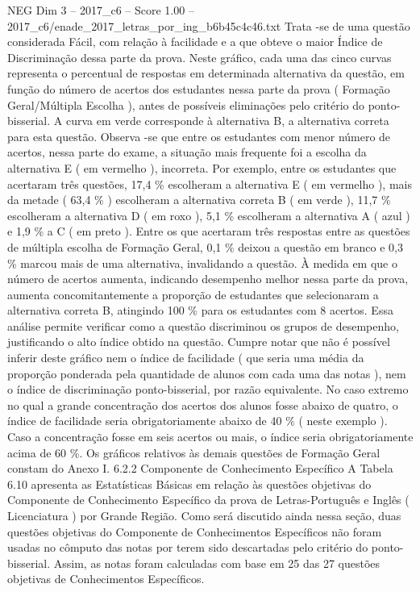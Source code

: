 \begin{textsample}{NEG Dim 3 – 2017\_c6 – Score 1.00 – 2017\_c6/enade\_2017\_letras\_por\_ing\_b6b45c4c46.txt}
Trata -se de uma questão considerada Fácil, com relação à facilidade e a que obteve o maior Índice de Discriminação dessa parte da prova.
Neste gráfico, cada uma das cinco curvas representa o percentual de respostas em determinada alternativa da questão, em função do número de acertos dos estudantes nessa parte da prova ( Formação Geral/Múltipla Escolha ), antes de possíveis eliminações pelo critério do ponto-bisserial.
A curva em verde corresponde à alternativa B, a alternativa correta para esta questão.
Observa -se que entre os estudantes com menor número de acertos, nessa parte do exame, a situação mais frequente foi a escolha da alternativa E ( em vermelho ), incorreta.
Por exemplo, entre os estudantes que acertaram três questões, 17,4 \% escolheram a alternativa E ( em vermelho ), mais da metade ( 63,4 \% ) escolheram a alternativa correta B ( em verde ), 11,7 \% escolheram a alternativa D ( em roxo ), 5,1 \% escolheram a alternativa A ( azul ) e 1,9 \% a C ( em preto ).
Entre os que acertaram três respostas entre as questões de múltipla escolha de Formação Geral, 0,1 \% deixou a questão em branco e 0,3 \% marcou mais de uma alternativa, invalidando a questão.
À medida em que o número de acertos aumenta, indicando desempenho melhor nessa parte da prova, aumenta concomitantemente a proporção de estudantes que selecionaram a alternativa correta B, atingindo 100 \% para os estudantes com 8 acertos.
Essa análise permite verificar como a questão discriminou os grupos de desempenho, justificando o alto índice obtido na questão.
Cumpre notar que não é possível inferir deste gráfico nem o índice de facilidade ( que seria uma média da proporção ponderada pela quantidade de alunos com cada uma das notas ), nem o índice de discriminação ponto-bisserial, por razão equivalente.
No caso extremo no qual a grande concentração dos acertos dos alunos fosse abaixo de quatro, o índice de facilidade seria obrigatoriamente abaixo de 40 \% ( neste exemplo ).
Caso a concentração fosse em seis acertos ou mais, o índice seria obrigatoriamente acima de 60 \%.
Os gráficos relativos às demais questões de Formação Geral constam do Anexo I. 6.2.2 Componente de Conhecimento Específico A Tabela 6.10 apresenta as Estatísticas Básicas em relação às questões objetivas do Componente de Conhecimento Específico da prova de Letras-Português e Inglês ( Licenciatura ) por Grande Região.
Como será discutido ainda nessa seção, duas questões objetivas do Componente de Conhecimentos Específicos não foram usadas no cômputo das notas por terem sido descartadas pelo critério do ponto-bisserial.
Assim, as notas foram calculadas com base em 25 das 27 questões objetivas de Conhecimentos Específicos.

\end{textsample}
